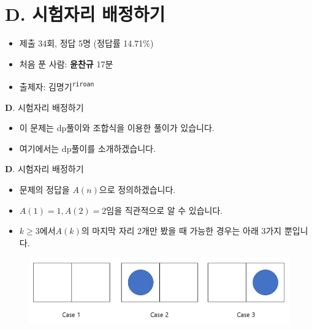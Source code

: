 \section{D. 시험자리 배정하기}

\begin{frame} %
    \begin{itemize}
    	\item 제출 34회, 정답 5명 (정답률 14.71\%)
    	\item 처음 푼 사람: \textbf{윤찬규} 17분
        \item 출제자: 김명기\textsuperscript{\color{kupc-gray}\texttt{riroan}}
    \end{itemize}
\end{frame}

\begin{frame}{\textbf{D}. 시험자리 배정하기}

    \begin{itemize}
    	\item 이 문제는 dp풀이와 조합식을 이용한 풀이가 있습니다.
    	\item 여기에서는 dp풀이를 소개하겠습니다.
    \end{itemize}
    
\end{frame}


\begin{frame}{\textbf{D}. 시험자리 배정하기}
	
	\begin{itemize}
		\item 문제의 정답을 $A(n)$으로 정의하겠습니다.
		\item $A(1) = 1, A(2) = 2$임을 직관적으로 알 수 있습니다.
		\item $k \ge 3$에서$A(k)$의 마지막 자리 2개만 봤을 때 가능한 경우는 아래 3가지 뿐입니다.

	\end{itemize}
	\begin{figure}[h!]
		\centering
		\includegraphics[width=0.7\linewidth]{../images/set-examseats/1.png}
	\end{figure}
\end{frame}

